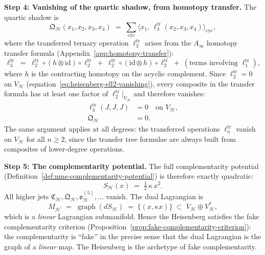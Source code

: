\begin{computation}
\medskip
\noindent\textbf{Step 4: Vanishing of the quartic shadow, from
 homotopy transfer.}
The quartic shadow is
\begin{equation}\label{eq:heisenberg-quartic-formula}
 \mathfrak{Q}_{\mathcal{H}}(x_1, x_2, x_3, x_4)
 \;=\;
 \sum_{\mathrm{cyc}} \bigl\langle x_1,\,
 \ell_3^{\mathrm{tr}}(x_2, x_3, x_4)
 \bigr\rangle_{\mathrm{cyc}},
\end{equation}
where the transferred ternary operation $\ell_3^{\mathrm{tr}}$
arises from the $A_\infty$ homotopy transfer formula
(Appendix~\ref{app:homotopy-transfer}):
\begin{equation}\label{eq:heisenberg-transfer-formula}
 \ell_3^{\mathrm{tr}}
 \;=\;
 \ell_2^{\mathrm{tr}} \circ (h \otimes \mathrm{id})
 \circ \ell_2^{\mathrm{tr}}
 \;+\;
 \ell_2^{\mathrm{tr}} \circ (\mathrm{id} \otimes h)
 \circ \ell_2^{\mathrm{tr}}
 \;+\; (\text{terms involving } \ell_1^{\mathrm{tr}}),
\end{equation}
where $h$ is the contracting homotopy on the acyclic complement.
Since $\ell_2^{\mathrm{tr}} = 0$ on $V_{\mathcal{H}}$
(equation~\eqref{eq:heisenberg-ell2-vanishing}), every composite in
the transfer formula has at least one factor of
$\ell_2^{\mathrm{tr}}|_{V_{\mathcal{H}}}$ and therefore vanishes:
\begin{align}\label{eq:heisenberg-ell3-vanishing}
 \ell_3^{\mathrm{tr}}(J,J,J) &= 0
 \quad\text{on } V_{\mathcal{H}},\\
 \label{eq:heisenberg-quartic-vanishing}
 \mathfrak{Q}_{\mathcal{H}} &= 0.
\end{align}
The same argument applies at all degrees: the transferred operations
$\ell_n^{\mathrm{tr}}$ vanish on $V_{\mathcal{H}}$ for all
$n \ge 2$, since the transfer tree formulae are always built from
composites of lower-degree operations.

\medskip
\noindent\textbf{Step 5: The complementarity potential.}
The full complementarity potential
(Definition~\ref{def:nms-complementarity-potential}) is therefore
exactly quadratic:
\begin{equation}\label{eq:heisenberg-complementarity-potential}
 S_{\mathcal{H}}(x)
 \;=\;
 \tfrac{1}{2}\,\kappa\,x^2.
\end{equation}
All higher jets $\mathfrak{C}_{\mathcal{H}},
\mathfrak{Q}_{\mathcal{H}}, \mathfrak{o}^{(5)}_{\mathcal{H}},
\ldots$ vanish. The dual Lagrangian is
\begin{equation}\label{eq:heisenberg-dual-lagrangian}
 M_{\mathcal{H}^!}
 \;=\;
 \operatorname{graph}(dS_{\mathcal{H}})
 \;=\;
 \{(x, \kappa x)\} \;\subset\;
 V_{\mathcal{H}} \oplus V_{\mathcal{H}}^*,
\end{equation}
which is a \emph{linear} Lagrangian submanifold. Hence the
Heisenberg satisfies the fake complementarity criterion
(Proposition~\ref{prop:fake-complementarity-criterion}): the
complementarity is ``fake'' in the precise sense that the dual
Lagrangian is the graph of a \emph{linear} map. The Heisenberg is
the archetype of fake complementarity.


\end{computation}
